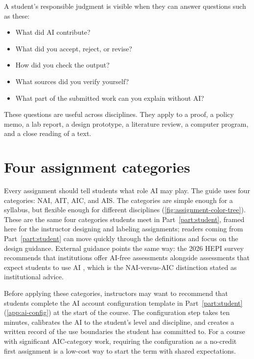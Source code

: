 \documentclass{SIAMbook2023}
\begin{document}
A student's responsible judgment is visible when they can answer questions such as these:

\begin{itemize}
\item What did AI contribute?
\item What did you accept, reject, or revise?
\item How did you check the output?
\item What sources did you verify yourself?
\item What part of the submitted work can you explain without AI?
\end{itemize}

These questions are useful across disciplines. They apply to a proof, a policy memo, a lab report, a design prototype, a literature review, a computer program, and a close reading of a text.

\section{Four assignment categories}
\label{i:sec:assignment-categories}%

Every assignment should tell students what role AI may play. The guide uses four categories: NAI, AIT, AIC, and AIS. The categories are simple enough for a syllabus, but flexible enough for different disciplines (\cref{fig:assignment-color-tree}). These are the same four categories students meet in Part~\ref{part:student}, framed here for the instructor designing and labeling assignments; readers coming from Part~\ref{part:student} can move quickly through the definitions and focus on the design guidance. External guidance points the same way: the 2026 HEPI survey recommends that institutions offer AI-free assessments alongside assessments that expect students to use AI \citep{stephenson2026student}, which is the NAI-versus-AIC distinction stated as institutional advice.

Before applying these categories, instructors may want to recommend that students complete the AI account configuration template in Part~\ref{part:student} (\cref{app:ai-config}) at the start of the course. The configuration step takes ten minutes, calibrates the AI to the student's level and discipline, and creates a written record of the use boundaries the student has committed to. For a course with significant AIC-category work, requiring the configuration as a no-credit first assignment is a low-cost way to start the term with shared expectations.
\end{document}
